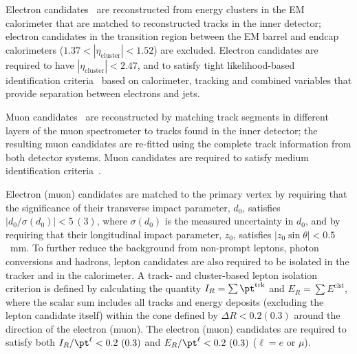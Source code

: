 \documentclass[PAPER, coverpage, atlasdraft=true, texlive=2016, UKenglish]{\ATLASLATEXPATH atlasdoc} %
\begin{document}
Electron candidates~\cite{EGAM-2018-01} are reconstructed from energy 
clusters in the EM calorimeter that are matched to reconstructed tracks in the inner detector;
electron candidates in the transition region between the EM barrel and endcap calorimeters 
($1.37 < |\eta_{\textrm{cluster}}| < 1.52$) are excluded.
Electron candidates are required to have $|\eta_{\textrm{cluster}}| < 2.47$, and to satisfy tight likelihood-based identification 
criteria~\cite{ATLAS-CONF-2016-024} based on calorimeter, tracking and combined variables that provide 
separation between electrons and jets. 

Muon candidates~\cite{MUON-2018-03} are reconstructed by matching track segments in %
different layers of the muon spectrometer to tracks found in the inner detector;
the resulting muon candidates are re-fitted using the complete track information from both detector systems.
Muon candidates are required to satisfy medium identification criteria~\cite{Aad:2016jkr}. 

Electron (muon) candidates are matched to the primary vertex by requiring that the significance of their transverse impact parameter, $d_0$, 
satisfies $|d_0/\sigma(d_0)|<5\,(3)$, where $\sigma(d_0)$ is the measured uncertainty in $d_0$,
and by requiring that their longitudinal impact parameter, $z_0$, satisfies $|z_0 \sin\theta|<0.5$~mm.
To further reduce the background from non-prompt leptons, photon conversions and hadrons, lepton candidates are also required to be isolated 
in the tracker and in the calorimeter.
A track- and cluster-based lepton isolation criterion is defined by calculating the quantity $I_R = \sum \pt^{\textrm{trk}}$ and $E_R = \sum E^{\textrm{clst}}$, where
the scalar sum includes all tracks and energy deposits (excluding the lepton candidate itself) within the cone defined by $\Delta R<0.2 (0.3)$ around the %
direction of the electron (muon). The electron (muon) candidates are required to satisfy both
$I_R/\pt^\ell < 0.2~(0.3)$ and $E_R/\pt^\ell < 0.2~(0.3)$ ($\ell=e$ or $\mu$).
\end{document}
